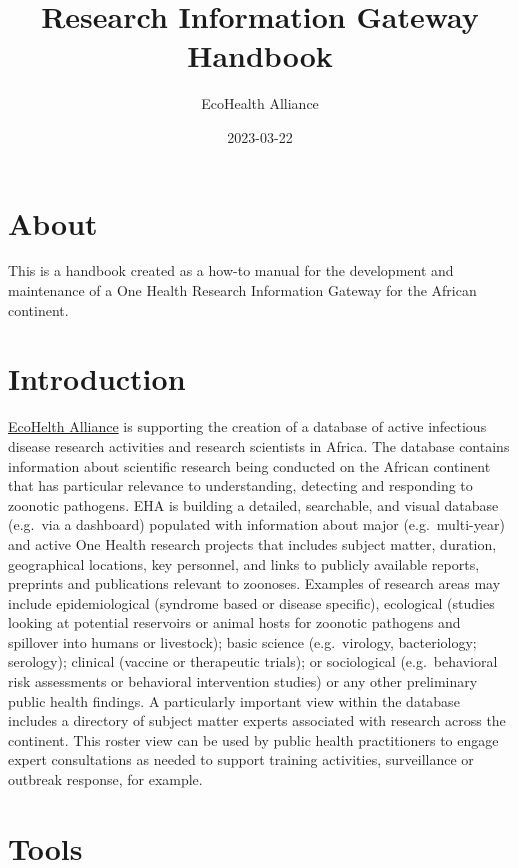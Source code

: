 \documentclass[
]{book}
\title{Research Information Gateway Handbook}
\author{EcoHealth Alliance}
\date{2023-03-22}
\begin{document}
\maketitle

{
\setcounter{tocdepth}{1}
\tableofcontents
}
\hypertarget{about}{%
\chapter{About}\label{about}}

This is a handbook created as a how-to manual for the development and maintenance of a One Health Research Information Gateway for the African continent.

\hypertarget{introduction}{%
\chapter{Introduction}\label{introduction}}

\href{https://www.ecohealthalliance.org/}{EcoHelth Alliance} is supporting the creation of a database of active infectious disease research activities and research scientists in Africa. The database contains information about scientific research being conducted on the African continent that has particular relevance to understanding, detecting and responding to zoonotic pathogens. EHA is building a detailed, searchable, and visual database (e.g.~via a dashboard) populated with information about major (e.g.~multi-year) and active One Health research projects that includes subject matter, duration, geographical locations, key personnel, and links to publicly available reports, preprints and publications relevant to zoonoses. Examples of research areas may include epidemiological (syndrome based or disease specific), ecological (studies looking at potential reservoirs or animal hosts for zoonotic pathogens and spillover into humans or livestock); basic science (e.g.~virology, bacteriology; serology); clinical (vaccine or therapeutic trials); or sociological (e.g.~behavioral risk assessments or behavioral intervention studies) or any other preliminary public health findings. A particularly important view within the database includes a directory of subject matter experts associated with research across the continent. This roster view can be used by public health practitioners to engage expert consultations as needed to support training activities, surveillance or outbreak response, for example.

\hypertarget{tools}{%
\chapter{Tools}\label{tools}}
\end{document}
